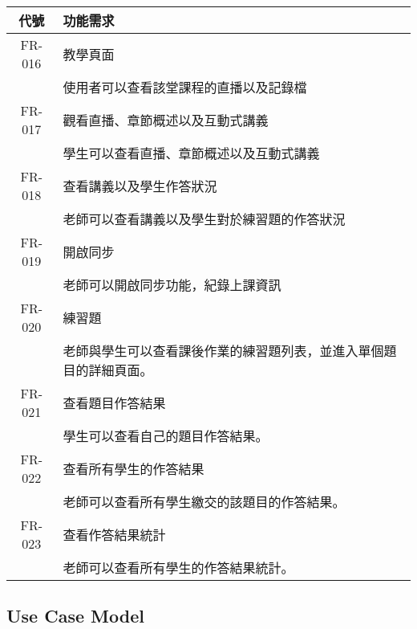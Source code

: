 \documentclass[12pt]{article}
\begin{document}
\begin{table}[H]
  \centering
  \begin{tabular}{|c|p{10cm}|}
    \hline
    \textbf{代號} & \textbf{功能需求} \\
    \hline
    FR-016 & 教學頁面 \\ 
    & 使用者可以查看該堂課程的直播以及記錄檔 \\  \hline
    FR-017 & 觀看直播、章節概述以及互動式講義 \\ 
    & 學生可以查看直播、章節概述以及互動式講義 \\  \hline
    FR-018 & 查看講義以及學生作答狀況 \\ 
    & 老師可以查看講義以及學生對於練習題的作答狀況 \\  \hline
    FR-019 & 開啟同步 \\ 
    & 老師可以開啟同步功能，紀錄上課資訊 \\  \hline
    FR-020 & 練習題 \\ 
    & 老師與學生可以查看課後作業的練習題列表，並進入單個題目的詳細頁面。\\ \hline
    FR-021 & 查看題目作答結果 \\ 
    & 學生可以查看自己的題目作答結果。 \\ \hline
    FR-022 & 查看所有學生的作答結果 \\ 
    & 老師可以查看所有學生繳交的該題目的作答結果。 \\ \hline 
    FR-023 & 查看作答結果統計 \\ 
    & 老師可以查看所有學生的作答結果統計。 \\ \hline
  \end{tabular}
\end{table}

\subsection{Use Case Model}
\end{document}
